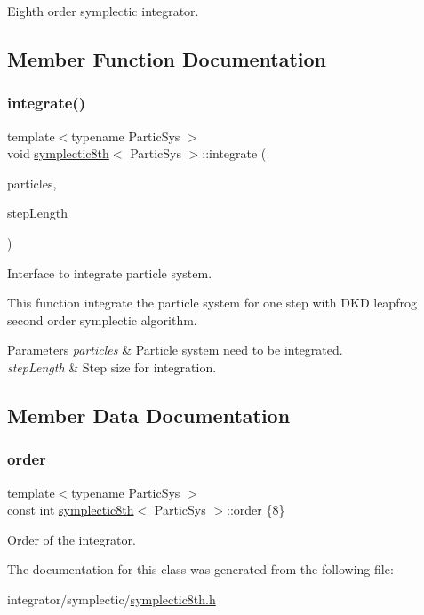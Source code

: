 Eighth order symplectic integrator. 

\subsection{Member Function Documentation}
\mbox{\label{classsymplectic8th_ab00fe2604c1471a27c2e6301c3820343}} 
\subsubsection{\texorpdfstring{integrate()}{integrate()}}
{\footnotesize\ttfamily template$<$typename Partic\+Sys $>$ \\
void \mbox{\hyperlink{classsymplectic8th}{symplectic8th}}$<$ Partic\+Sys $>$\+::integrate (\begin{DoxyParamCaption}\item[{Partic\+Sys \&}]{particles,  }\item[{double}]{step\+Length }\end{DoxyParamCaption})}



Interface to integrate particle system. 

This function integrate the particle system for one step with D\+KD leapfrog second order symplectic algorithm. 
\begin{DoxyParams}{Parameters}
{\em particles} & Particle system need to be integrated. \\
\hline
{\em step\+Length} & Step size for integration. \\
\hline
\end{DoxyParams}


\subsection{Member Data Documentation}
\mbox{\label{classsymplectic8th_a5f80ae81362e3542cb9ed7653f1b20d6}} 
\subsubsection{\texorpdfstring{order}{order}}
{\footnotesize\ttfamily template$<$typename Partic\+Sys $>$ \\
const int \mbox{\hyperlink{classsymplectic8th}{symplectic8th}}$<$ Partic\+Sys $>$\+::order \{8\}\hspace{0.3cm}{\ttfamily [static]}}



Order of the integrator. 



The documentation for this class was generated from the following file\+:\begin{DoxyCompactItemize}
\item 
integrator/symplectic/\mbox{\hyperlink{symplectic8th_8h}{symplectic8th.\+h}}\end{DoxyCompactItemize}
